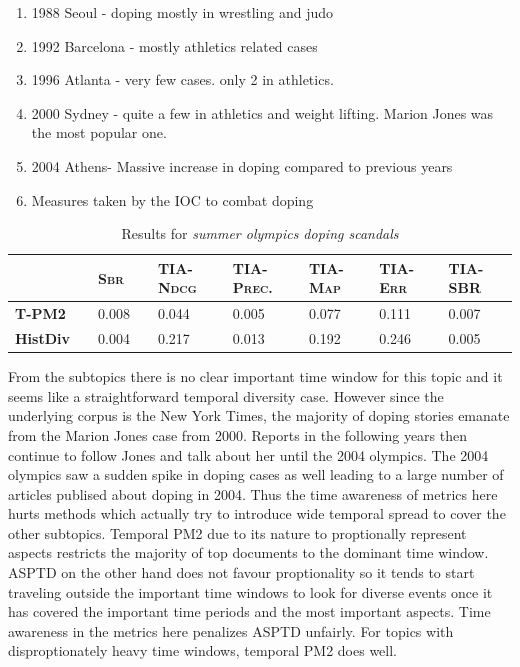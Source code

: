 \begin{enumerate}
  \item 1988 Seoul - doping mostly in wrestling and judo
  \item 1992 Barcelona - mostly athletics related cases
  \item 1996 Atlanta - very few cases. only 2 in athletics.
  \item 2000 Sydney - quite a few in athletics and weight lifting. Marion Jones was the most popular one.
  \item 2004 Athens- Massive increase in doping compared to previous years
  \item Measures taken by the IOC to combat doping
\end{enumerate}


\begin{table}[!t]
  \small
  \centering
  \begin{tabular}{@{}rccllllllllllll@{}}\toprule
  \multicolumn{2}{l}{} && \textsc{Sbr} && \textsc{TIA-Ndcg} &&  \textsc{TIA-Prec.} && \textsc{TIA-Map} && \textsc{TIA-Err} && \textsc{TIA-SBR} \\ \midrule
  \multicolumn{2}{l}{\textbf{T-PM2}} && 0.008 && 0.044 && 0.005 && 0.077 && 0.111 && 0.007 \\ \midrule
  \multicolumn{2}{l}{\textbf{HistDiv}} && 0.004 && 0.217 && 0.013 && 0.192 && 0.246 && 0.005 \\ \bottomrule
  \end{tabular}
  \caption{Results for \emph{summer olympics doping scandals}}
\label{table:olympics}
\end{table}


From the subtopics there is no clear important time window for this topic and it seems like a straightforward temporal diversity case. However since the underlying corpus is the New York Times, the majority of doping stories emanate from the Marion Jones case from 2000. Reports in the following years then continue to follow Jones and talk about her until the 2004 olympics. The 2004 olympics saw a sudden spike in doping cases as well leading to a large number of articles publised about doping in 2004. Thus the time awareness of metrics here hurts methods which actually try to introduce wide temporal spread to cover the other subtopics. Temporal PM2 due to its nature to proptionally represent aspects restricts the majority of top documents to the dominant time window. ASPTD on the other hand does not favour proptionality so it tends to start traveling outside the important time windows to look for diverse events once it has covered the important time periods and the most important aspects. Time awareness in the metrics here penalizes ASPTD unfairly. For topics with disproptionately heavy time windows, temporal PM2 does well.

